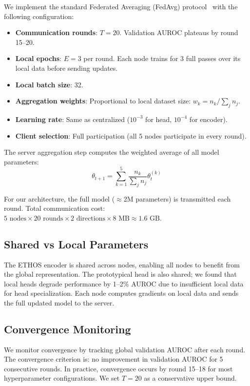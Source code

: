 We implement the standard Federated Averaging (FedAvg) protocol~\cite{mcmahan2017communication} with the following configuration:
\begin{itemize}
\item \textbf{Communication rounds}: $T = 20$. Validation AUROC plateaus by round 15--20.
\item \textbf{Local epochs}: $E = 3$ per round. Each node trains for 3 full passes over its local data before sending updates.
\item \textbf{Local batch size}: 32.
\item \textbf{Aggregation weights}: Proportional to local dataset size: $w_k = n_k / \sum_j n_j$.
\item \textbf{Learning rate}: Same as centralized ($10^{-3}$ for head, $10^{-4}$ for encoder).
\item \textbf{Client selection}: Full participation (all 5 nodes participate in every round).
\end{itemize}

The server aggregation step computes the weighted average of all model parameters:
\begin{equation}
\theta_{t+1} = \sum_{k=1}^{5} \frac{n_k}{\sum_j n_j} \theta_{t}^{(k)}
\end{equation}

For our architecture, the full model ($\approx$2M parameters) is transmitted each round. Total communication cost: $5 \text{ nodes} \times 20 \text{ rounds} \times 2 \text{ directions} \times 8\text{ MB} \approx 1.6\text{ GB}$.

\subsection{Shared vs Local Parameters}

The ETHOS encoder is shared across nodes, enabling all nodes to benefit from the global representation. The prototypical head is also shared; we found that local heads degrade performance by 1--2\% AUROC due to insufficient local data for head specialization. Each node computes gradients on local data and sends the full updated model to the server.

\subsection{Convergence Monitoring}

We monitor convergence by tracking global validation AUROC after each round. The convergence criterion is: no improvement in validation AUROC for 5 consecutive rounds. In practice, convergence occurs by round 15--18 for most hyperparameter configurations. We set $T=20$ as a conservative upper bound.

